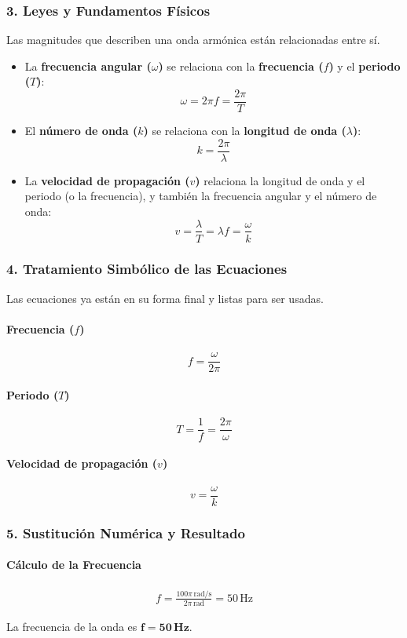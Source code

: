 \subsubsection*{3. Leyes y Fundamentos Físicos}
Las magnitudes que describen una onda armónica están relacionadas entre sí.
\begin{itemize}
    \item La \textbf{frecuencia angular ($\omega$)} se relaciona con la \textbf{frecuencia ($f$)} y el \textbf{periodo ($T$)}:
    $$\omega = 2\pi f = \frac{2\pi}{T}$$
    \item El \textbf{número de onda ($k$)} se relaciona con la \textbf{longitud de onda ($\lambda$)}:
    $$k = \frac{2\pi}{\lambda}$$
    \item La \textbf{velocidad de propagación ($v$)} relaciona la longitud de onda y el periodo (o la frecuencia), y también la frecuencia angular y el número de onda:
    $$v = \frac{\lambda}{T} = \lambda f = \frac{\omega}{k}$$
\end{itemize}

\subsubsection*{4. Tratamiento Simbólico de las Ecuaciones}
Las ecuaciones ya están en su forma final y listas para ser usadas.
\paragraph*{Frecuencia ($f$)}
$$f = \frac{\omega}{2\pi}$$
\paragraph*{Periodo ($T$)}
$$T = \frac{1}{f} = \frac{2\pi}{\omega}$$
\paragraph*{Velocidad de propagación ($v$)}
$$v = \frac{\omega}{k}$$

\subsubsection*{5. Sustitución Numérica y Resultado}
\paragraph*{Cálculo de la Frecuencia}
\begin{gather}
    f = \frac{100\pi \, \text{rad/s}}{2\pi \, \text{rad}} = 50 \, \text{Hz}
\end{gather}
\begin{cajaresultado}
    La frecuencia de la onda es $\boldsymbol{f = 50 \, \textbf{Hz}}$.
\end{cajaresultado}

